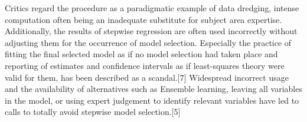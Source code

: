 Critics regard the procedure as a paradigmatic example of data dredging, intense computation often being an inadequate substitute for subject area expertise. Additionally, the results of stepwise regression are often used incorrectly without adjusting them for the occurrence of model selection. Especially the practice of fitting the final selected model as if no model selection had taken place and reporting of estimates and confidence intervals as if least-squares theory were valid for them, has been described as a scandal.[7] Widespread incorrect usage and the availability of alternatives such as Ensemble learning, leaving all variables in the model, or using expert judgement to identify relevant variables have led to calls to totally avoid stepwise model selection.[5]

